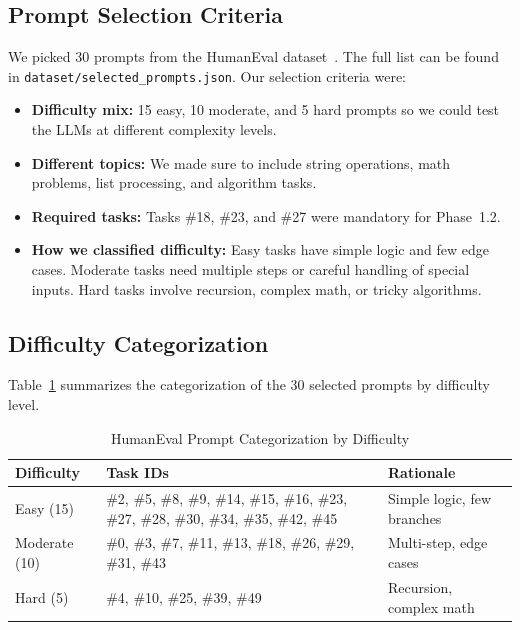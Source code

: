 \documentclass[12pt, a4paper]{article}
\begin{document}
\subsection{Prompt Selection Criteria}

We picked 30 prompts from the HumanEval dataset~\cite{humaneval}. 
The full list can be found in \texttt{dataset/selected\_prompts.json}. 
Our selection criteria were:

\begin{itemize}
    \item \textbf{Difficulty mix:} 15 easy, 10 moderate, and 5 hard prompts so we could test the LLMs at different complexity levels.
    \item \textbf{Different topics:} We made sure to include string operations, math problems, list processing, and algorithm tasks.
    \item \textbf{Required tasks:} Tasks \#18, \#23, and \#27 were mandatory for Phase~1.2.
    \item \textbf{How we classified difficulty:} Easy tasks have simple logic and few edge cases. Moderate tasks need multiple steps or careful handling of special inputs. Hard tasks involve recursion, complex math, or tricky algorithms.
\end{itemize}

\subsection{Difficulty Categorization}

Table~\ref{tab:prompt-difficulty} summarizes the categorization of the 30 selected prompts by difficulty level.

\begin{table}[H]
\centering
\caption{HumanEval Prompt Categorization by Difficulty}
\label{tab:prompt-difficulty}
\begin{tabularx}{\textwidth}{l X l}
\toprule
\textbf{Difficulty} & \textbf{Task IDs} & \textbf{Rationale} \\
\midrule
Easy (15)  & \#2, \#5, \#8, \#9, \#14, \#15, \#16, \#23, \#27, \#28, \#30, \#34, \#35, \#42, \#45 & Simple logic, few branches \\
\addlinespace
Moderate (10) & \#0, \#3, \#7, \#11, \#13, \#18, \#26, \#29, \#31, \#43 & Multi-step, edge cases \\
\addlinespace
Hard (5)   & \#4, \#10, \#25, \#39, \#49 & Recursion, complex math \\
\bottomrule
\end{tabularx}
\end{table}
\end{document}
